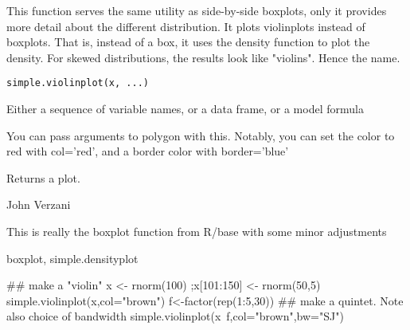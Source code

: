 \begin{Description}\relax
This function serves the same utility as side-by-side boxplots, only
it provides more detail about the different distribution. It
plots violinplots instead of boxplots. That is, instead of a box, it
uses the density function to plot the density. For skewed
distributions, the results look like "violins". Hence the name.
\end{Description}
\begin{Usage}
\begin{verbatim}
simple.violinplot(x, ...)
\end{verbatim}
\end{Usage}
\begin{Arguments}
\begin{ldescription}
\item[\code{x}] Either a sequence of variable names, or a data frame, or a
model formula
\item[\code{...}] You can pass arguments to polygon with this. Notably, you 
can set the color to red with col='red', and a border color with border='blue'
\end{ldescription}
\end{Arguments}
\begin{Value}
Returns a plot.
\end{Value}
\begin{Author}\relax
John Verzani
\end{Author}
\begin{References}\relax
This is really the boxplot function from R/base with some
minor adjustments
\end{References}
\begin{SeeAlso}\relax
boxplot, simple.densityplot
\end{SeeAlso}
\begin{Examples}
\begin{ExampleCode}
## make a "violin"
x <- rnorm(100) ;x[101:150] <- rnorm(50,5)
simple.violinplot(x,col="brown")
f<-factor(rep(1:5,30))
## make a quintet. Note also choice of bandwidth
simple.violinplot(x~f,col="brown",bw="SJ")


\end{ExampleCode}
\end{Examples}

